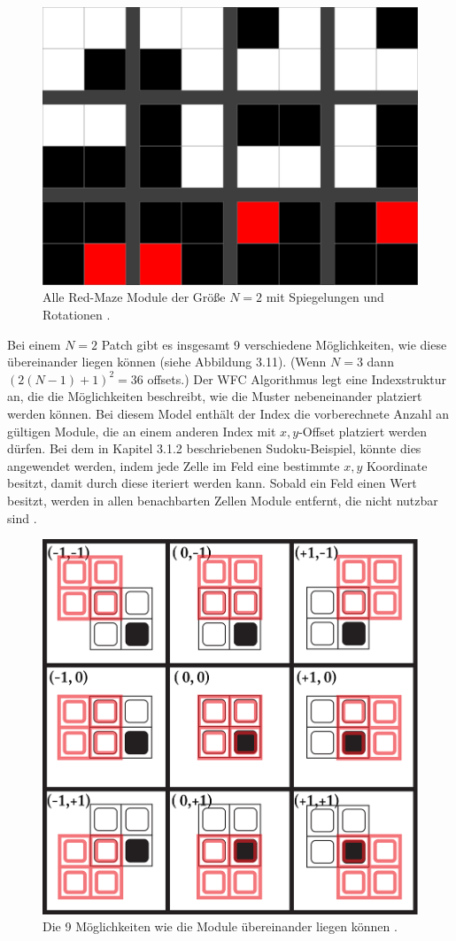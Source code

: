 \documentclass[12pt, a4paper,twoside,openany]{report} %
\begin{document}
\begin{figure}[H]
    \centering
    \includegraphics[width=0.5\linewidth]{images/red-maze-modules.jpg}%
    \caption{Alle Red-Maze Module der Größe $N = 2$ mit Spiegelungen und Rotationen \cite{Karth2017WaveFunctionCollapseIC}.}%
\end{figure}

Bei einem $N = 2$ Patch gibt es insgesamt 9 verschiedene Möglichkeiten, wie diese übereinander liegen können {(siehe Abbildung 3.11)}.
{(Wenn $N = 3$ dann $(2(N - 1) + 1)^2 = 36$ offsets.)}
Der WFC Algorithmus legt eine Indexstruktur an, die die Möglichkeiten beschreibt, wie die Muster nebeneinander platziert werden können.
Bei diesem Model enthält der Index die vorberechnete Anzahl an gültigen Module, die an einem anderen Index mit $x,y$-Offset platziert werden dürfen. 
Bei dem in Kapitel 3.1.2 beschriebenen Sudoku-Beispiel, könnte dies angewendet werden,
indem jede Zelle im Feld eine bestimmte $x,y$ Koordinate besitzt, damit durch diese iteriert werden kann.
Sobald ein Feld einen Wert besitzt, werden in allen benachbarten Zellen Module entfernt, die nicht nutzbar sind \cite{Karth2017WaveFunctionCollapseIC}.

\begin{figure}[H]
    \centering
    \includegraphics[width=0.5\linewidth]{images/red-maze-offset.png}%
    \caption{Die 9 Möglichkeiten wie die Module übereinander liegen können \cite{Karth2017WaveFunctionCollapseIC}.}%
\end{figure}
\end{document}
